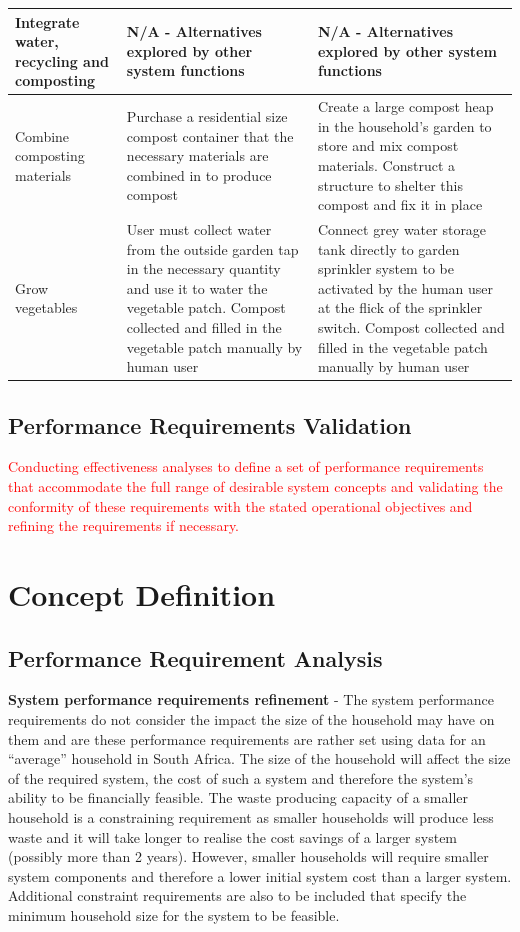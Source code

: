 \documentclass[a4paper,11pt,fleqn]{report}
\begin{document}
\begin{table}[h!]
\begin{center}
\begin{tabular}{p{3.5cm}|p{6cm}|p{6cm}}
    \hline
    Integrate water, recycling and composting & N/A - Alternatives explored by other system functions & N/A - Alternatives explored by other system functions\\
    \hline
     Combine composting materials & Purchase a residential size compost container that the necessary materials are combined in to produce compost & Create a large compost heap in the household's garden to store and mix compost materials. Construct a structure to shelter this compost and fix it in place\\
    \hline
     Grow vegetables & User must collect water from the outside garden tap in the necessary quantity and use it to water the vegetable patch. Compost collected and filled in the vegetable patch manually by human user & Connect grey water storage tank directly to garden sprinkler system to be activated by the human user at the flick of the sprinkler switch. Compost collected and filled in the vegetable patch manually by human user\\
    \hline
    \bottomrule
\end{tabular}
\end{center}
\end{table}
%
	
\subsection{Performance Requirements Validation}
\textcolor{red}{Conducting effectiveness analyses to define a set of performance requirements that accommodate the full range of desirable system concepts and validating the conformity of these requirements with the stated operational objectives and refining the requirements if necessary.}

\section{Concept Definition}
\subsection{Performance Requirement Analysis}
\textbf{System performance requirements refinement} - The system performance requirements do not consider the impact the size of the household may have on them and are these performance requirements are rather set using data for an “average” household in South Africa. The size of the household will affect the size of the required system, the cost of such a system and therefore the system’s ability to be financially feasible. The waste producing capacity of a smaller household is a constraining requirement as smaller households will produce less waste and it will take longer to realise the cost savings of a larger system (possibly more than 2 years). However, smaller households will require smaller system components and therefore a lower initial system cost than a larger system. Additional constraint requirements are also to be included that specify the minimum household size for the system to be feasible.
\end{document}
